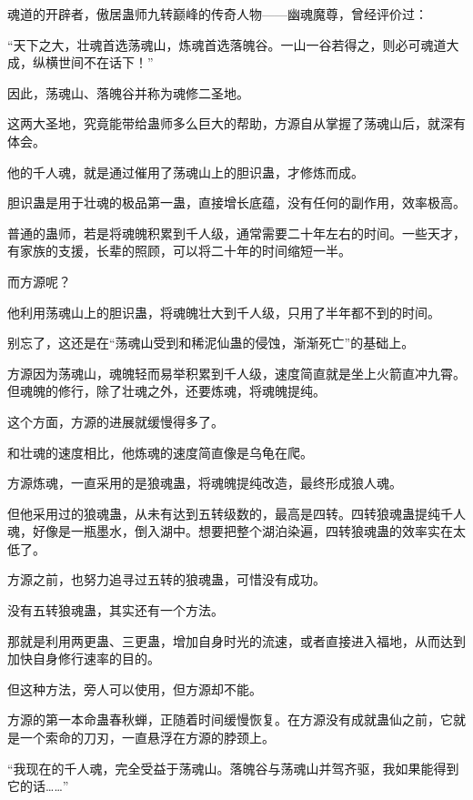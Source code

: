 
\begin{this_body}



魂道的开辟者，傲居蛊师九转巅峰的传奇人物——幽魂魔尊，曾经评价过：

“天下之大，壮魂首选荡魂山，炼魂首选落魄谷。一山一谷若得之，则必可魂道大成，纵横世间不在话下！”

因此，荡魂山、落魄谷并称为魂修二圣地。

这两大圣地，究竟能带给蛊师多么巨大的帮助，方源自从掌握了荡魂山后，就深有体会。

他的千人魂，就是通过催用了荡魂山上的胆识蛊，才修炼而成。

胆识蛊是用于壮魂的极品第一蛊，直接增长底蕴，没有任何的副作用，效率极高。

普通的蛊师，若是将魂魄积累到千人级，通常需要二十年左右的时间。一些天才，有家族的支援，长辈的照顾，可以将二十年的时间缩短一半。

而方源呢？

他利用荡魂山上的胆识蛊，将魂魄壮大到千人级，只用了半年都不到的时间。

别忘了，这还是在“荡魂山受到和稀泥仙蛊的侵蚀，渐渐死亡”的基础上。

方源因为荡魂山，魂魄轻而易举积累到千人级，速度简直就是坐上火箭直冲九霄。但魂魄的修行，除了壮魂之外，还要炼魂，将魂魄提纯。

这个方面，方源的进展就缓慢得多了。

和壮魂的速度相比，他炼魂的速度简直像是乌龟在爬。

方源炼魂，一直采用的是狼魂蛊，将魂魄提纯改造，最终形成狼人魂。

但他采用过的狼魂蛊，从未有达到五转级数的，最高是四转。四转狼魂蛊提纯千人魂，好像是一瓶墨水，倒入湖中。想要把整个湖泊染遍，四转狼魂蛊的效率实在太低了。

方源之前，也努力追寻过五转的狼魂蛊，可惜没有成功。

没有五转狼魂蛊，其实还有一个方法。

那就是利用两更蛊、三更蛊，增加自身时光的流速，或者直接进入福地，从而达到加快自身修行速率的目的。

但这种方法，旁人可以使用，但方源却不能。

方源的第一本命蛊春秋蝉，正随着时间缓慢恢复。在方源没有成就蛊仙之前，它就是一个索命的刀刃，一直悬浮在方源的脖颈上。

“我现在的千人魂，完全受益于荡魂山。落魄谷与荡魂山并驾齐驱，我如果能得到它的话……”


\end{this_body}
